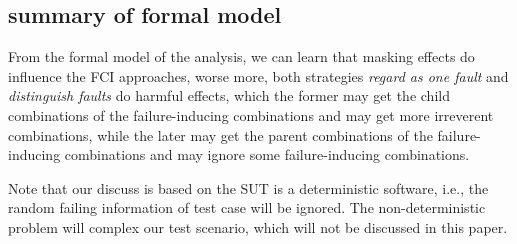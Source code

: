 \documentclass{sig-alternate}
\begin{document}
%
%
%
%
%
\subsection{summary of formal model}
From the formal model of the analysis, we can learn that masking effects do influence the FCI approaches, worse more, both strategies \emph{regard as one fault} and \emph{distinguish faults} do harmful effects, which the former may get the child combinations of the failure-inducing combinations and may get more irreverent combinations, while the later may get the parent combinations of the failure-inducing combinations and may ignore some failure-inducing combinations.

Note that our discuss is based on the SUT is a deterministic software, i.e., the random failing information of test case will be ignored. The non-deterministic problem will complex our test scenario, which will not be discussed in this paper.
\end{document}
